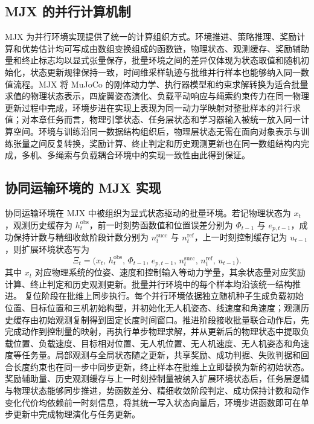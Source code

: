 \subsection{MJX 的并行计算机制}

MJX 为并行环境实现提供了统一的计算组织方式。环境推进、策略推理、奖励计算和优势估计均可写成由数组变换组成的函数链，物理状态、观测缓存、奖励辅助量和终止标志均以显式张量保存，批量环境之间的差异仅体现为状态取值和随机初始化，状态更新规律保持一致，时间维采样轨迹与批维并行样本也能够纳入同一数值流程。MJX 将 MuJoCo 的刚体动力学、执行器模型和约束求解转换为适合批量求值的物理状态表示，四旋翼姿态演化、负载平动响应与绳索约束传力在同一物理更新过程中完成，环境步进在实现上表现为同一动力学映射对整批样本的并行求值；对本章任务而言，物理引擎状态、任务层状态和学习器输入被统一放入同一计算空间。环境与训练沿同一数据结构组织后，物理层状态无需在面向对象表示与训练张量之间反复转换，奖励计算、终止判定和历史观测更新也在同一数组结构内完成，多机、多绳索与负载耦合环境中的实现一致性由此得到保证。

\subsection{协同运输环境的 MJX 实现}

协同运输环境在 MJX 中被组织为显式状态驱动的批量环境。若记物理状态为 $x_t$，观测历史缓存为 $h_t^{\mathrm{obs}}$，前一时刻势函数值和位置误差分别为 $\Phi_{t-1}$ 与 $e_{p,t-1}$，成功保持计数与精细收敛阶段计数分别为 $n_t^{\mathrm{succ}}$ 与 $n_t^{\mathrm{ref}}$，上一时刻控制缓存记为 $u_{t-1}$，则扩展环境状态写为
\begin{equation}
    \Xi_t=
    \big(
    x_t,\,
    h_t^{\mathrm{obs}},\,
    \Phi_{t-1},\,
    e_{p,t-1},\,
    n_t^{\mathrm{succ}},\,
    n_t^{\mathrm{ref}},\,
    u_{t-1}
    \big).
\end{equation}
其中 $x_t$ 对应物理系统的位姿、速度和控制输入等动力学量，其余状态量对应奖励计算、终止判定和历史观测更新。批量并行环境中的每个样本均沿该统一结构推进。
复位阶段在批维上同步执行。每个并行环境依据独立随机种子生成负载初始位置、目标位置和三机初始构型，并初始化无人机姿态、线速度和角速度；观测历史缓存由初始观测复制得到固定长度时间窗口。推进阶段接收批量联合动作后，先完成动作到控制量的映射，再执行单步物理求解，并从更新后的物理状态中提取负载位置、负载速度、目标相对位置、无人机位置、无人机速度、无人机姿态和角速度等任务量。局部观测与全局状态随之更新，共享奖励、成功判据、失败判据和回合长度约束也在同一步中同步更新，终止样本在批维上立即替换为新的初始状态。奖励辅助量、历史观测缓存与上一时刻控制量被纳入扩展环境状态后，任务层逻辑与物理状态能够同步推进，势函数差分、精细收敛阶段判定、成功保持计数和动作变化代价均依赖前一时刻信息，将其统一写入状态向量后，环境步进函数即可在单步更新中完成物理演化与任务更新。

